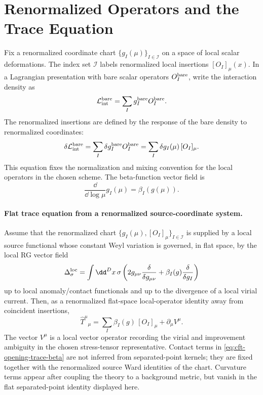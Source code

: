 \section{Renormalized Operators and the Trace Equation}

Fix a renormalized coordinate chart \(\{g_I(\mu)\}_{I\in\mathcal I}\) on a
space of local scalar deformations.  The index set \(\mathcal I\) labels
renormalized local insertions \([O_I]_\mu(x)\).  In a Lagrangian presentation
with bare scalar operators \(O_I^{\rm bare}\), write the interaction density as
\begin{equation}
  \mathcal L_{\rm int}^{\rm bare}
  =
  \sum_I g_I^{\rm bare}O_I^{\rm bare}.
  \label{eq:cft-opening-bare-interaction}
\end{equation}
The renormalized insertions are defined by the response of the bare density to
renormalized coordinates:
\begin{equation}
  \delta\mathcal L_{\rm int}^{\rm bare}
  =
  \sum_I \delta g_I^{\rm bare}O_I^{\rm bare}
  =
  \sum_I \delta g_I(\mu)\,[O_I]_\mu .
  \label{eq:cft-opening-renormalized-insertions}
\end{equation}
This equation fixes the normalization and mixing convention for the local
operators in the chosen scheme.  The beta-function vector field is
\begin{equation}
  \frac{\dd}{\dd\log\mu}g_I(\mu)
  =
  \beta_I(g(\mu)).
  \label{eq:cft-opening-beta-function}
\end{equation}

\paragraph{Flat trace equation from a renormalized source-coordinate system.}
Assume that the renormalized chart
\(\{g_I(\mu),[O_I]_\mu\}_{I\in\mathcal I}\) is supplied by a local source
functional whose constant Weyl variation is governed, in flat space, by the
local RG vector field
\[
  \Delta_\sigma^{\rm loc}
  =
  \int\dd^D x\,\sigma
  \left(
    2g_{\mu\nu}\frac{\delta}{\delta g_{\mu\nu}}
    +
    \beta_I(g)\frac{\delta}{\delta g_I}
  \right)
\]
up to local anomaly/contact functionals and up to the divergence of a local
virial current.  Then, as a renormalized flat-space local-operator identity
away from coincident insertions,
\begin{equation}
  \widehat T^\mu{}_\mu
  =
  \sum_I\beta_I(g)\,[O_I]_\mu
  +
  \partial_\mu V^\mu .
  \label{eq:cft-opening-trace-beta}
\end{equation}
The vector \(V^\mu\) is a local vector operator recording the virial and
improvement ambiguity in the chosen stress-tensor representative.  Contact
terms in \eqref{eq:cft-opening-trace-beta} are not inferred from
separated-point kernels; they are fixed together with the renormalized source
Ward identities of the chart.  Curvature terms appear after coupling the
theory to a background metric, but vanish in the flat separated-point identity
displayed here.

